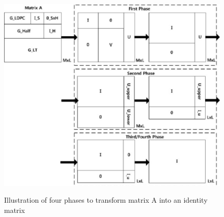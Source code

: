\begin{figure}[htbp]
\begin{center}
\mbox{
\includegraphics[width=5.5in]{Figures/decoder}}
\caption{Illustration of four phases to transform matrix A into an identity matrix \cite{wu2013fast}}
\label{decoder_fig}
\end{center}
\end{figure}

